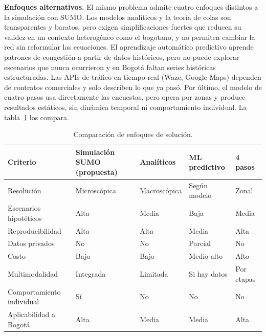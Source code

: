 \textbf{Enfoques alternativos.} El mismo problema admite cuatro enfoques distintos a la simulación con SUMO. Los modelos analíticos y la teoría de colas son transparentes y baratos, pero exigen simplificaciones fuertes que reducen su validez en un contexto heterogéneo como el bogotano, y no permiten cambiar la red sin reformular las ecuaciones. El aprendizaje automático predictivo \cite{vlahogianni} aprende patrones de congestión a partir de datos históricos, pero no puede explorar escenarios que nunca ocurrieron y en Bogotá faltan series históricas estructuradas. Las APIs de tráfico en tiempo real (Waze, Google Maps) dependen de contratos comerciales y solo describen lo que ya pasó. Por último, el modelo de cuatro pasos \cite{mcnally} usa directamente las encuestas, pero opera por zonas y produce resultados estáticos, sin dinámica temporal ni comportamiento individual. La tabla~\ref{tab:comparacion} los compara.

\begin{table}[ht]
\renewcommand{\arraystretch}{1.15}
\centering
\small
\begin{tabular}{|p{2.9cm}|p{2.6cm}|p{2.5cm}|p{2.5cm}|p{2.4cm}|}
\hline
\textbf{Criterio} & \textbf{Simulación SUMO (propuesta)} & \textbf{Analíticos} & \textbf{ML predictivo} & \textbf{4 pasos} \\ \hline
Resolución & Microscópica & Macroscópica & Según modelo & Zonal \\ \hline
Escenarios hipotéticos & Alta & Media & Baja & Media \\ \hline
Reproducibilidad & Alta & Alta & Media & Alta \\ \hline
Datos privados & No & No & Parcial & No \\ \hline
Costo & Bajo & Bajo & Medio-alto & Alto \\ \hline
Multimodalidad & Integrada & Limitada & Si hay datos & Por etapas \\ \hline
Comportamiento individual & Sí & No & No & No \\ \hline
Aplicabilidad a Bogotá & Alta & Media & Media & Alta \\ \hline
\end{tabular}
\caption{Comparación de enfoques de solución.}
\label{tab:comparacion}
\end{table}

